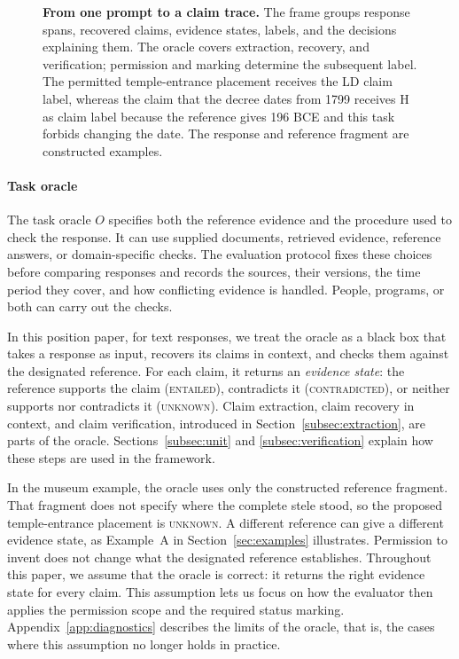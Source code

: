 \documentclass{clv2025}
\newcommand{\LD}{\textsc{LD}}
\newcommand{\Hall}{\textsc{H}}
\begin{document}
\begin{figure}[!t]
{}
\caption{\textbf{From one prompt to a claim trace.}
The frame groups response spans, recovered claims, evidence states, labels,
and the decisions explaining them. The oracle covers extraction, recovery,
and verification; permission and marking determine the subsequent label.
The permitted temple-entrance placement receives the \LD{} claim label, whereas the
claim that the decree dates from 1799 receives \Hall{} as claim label because the
reference gives 196 BCE and this task forbids changing the date.
The response and reference fragment are constructed examples.}

\label{fig:claim-label-annotation}
\end{figure}

\paragraph{Task oracle}
The task oracle $O$ specifies both the reference evidence and the procedure
used to check the response. It can use supplied documents, retrieved
evidence, reference answers, or domain-specific checks. The evaluation
protocol fixes these choices before comparing responses and records the
sources, their versions, the time period they cover, and how conflicting
evidence is handled. People, programs, or both can carry out the checks.

In this position paper, for text responses, we treat the oracle as a black box that takes a response as input,
recovers its claims in context, and checks them against the designated
reference. For each claim, it returns an
\emph{evidence state}: the reference supports the claim (\textsc{entailed}),
contradicts it (\textsc{contradicted}), or neither supports nor contradicts
it (\textsc{unknown}). Claim extraction, claim recovery in context, and
claim verification, introduced in Section~\ref{subsec:extraction}, are parts
of the oracle. Sections~\ref{subsec:unit} and \ref{subsec:verification}
explain how these steps are used in the framework.

In the museum example, the oracle uses only the constructed reference
fragment. That fragment does not specify where the complete stele stood,
so the proposed temple-entrance placement is \textsc{unknown}. A different
reference can give a different evidence state, as Example~A in
Section~\ref{sec:examples} illustrates. Permission to invent does not change
what the designated reference establishes.
Throughout this paper, we assume that the oracle is correct: it returns the
right evidence state for every claim. This assumption lets us focus on how
the evaluator then applies the permission scope and the required status
marking. Appendix~\ref{app:diagnostics} describes the limits of the oracle,
that is, the cases where this assumption no longer holds in practice.
\end{document}
